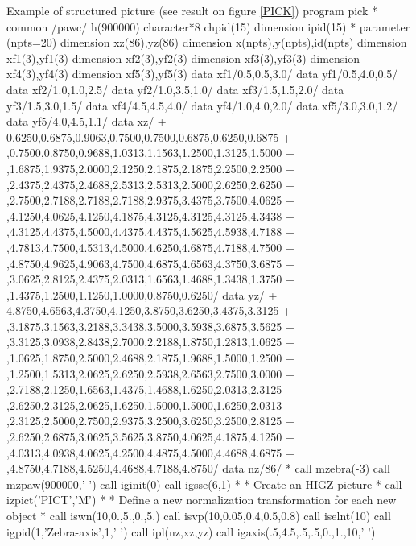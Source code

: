 \begin{XMPt}{Example of structured picture (see result on figure \ref{PICK})}
      program pick
*
      common /pawc/ h(900000)
      character*8 chpid(15)
      dimension ipid(15)
*
      parameter (npts=20)
      dimension xz(86),yz(86)
      dimension x(npts),y(npts),id(npts)
      dimension xf1(3),yf1(3)
      dimension xf2(3),yf2(3)
      dimension xf3(3),yf3(3)
      dimension xf4(3),yf4(3)
      dimension xf5(3),yf5(3)
      data xf1/0.5,0.5,3.0/
      data yf1/0.5,4.0,0.5/
      data xf2/1.0,1.0,2.5/
      data yf2/1.0,3.5,1.0/
      data xf3/1.5,1.5,2.0/
      data yf3/1.5,3.0,1.5/
      data xf4/4.5,4.5,4.0/
      data yf4/1.0,4.0,2.0/
      data xf5/3.0,3.0,1.2/
      data yf5/4.0,4.5,1.1/
      data xz/
     +   0.6250,0.6875,0.9063,0.7500,0.7500,0.6875,0.6250,0.6875
     +  ,0.7500,0.8750,0.9688,1.0313,1.1563,1.2500,1.3125,1.5000
     +  ,1.6875,1.9375,2.0000,2.1250,2.1875,2.1875,2.2500,2.2500
     +  ,2.4375,2.4375,2.4688,2.5313,2.5313,2.5000,2.6250,2.6250
     +  ,2.7500,2.7188,2.7188,2.7188,2.9375,3.4375,3.7500,4.0625
     +  ,4.1250,4.0625,4.1250,4.1875,4.3125,4.3125,4.3125,4.3438
     +  ,4.3125,4.4375,4.5000,4.4375,4.4375,4.5625,4.5938,4.7188
     +  ,4.7813,4.7500,4.5313,4.5000,4.6250,4.6875,4.7188,4.7500
     +  ,4.8750,4.9625,4.9063,4.7500,4.6875,4.6563,4.3750,3.6875
     +  ,3.0625,2.8125,2.4375,2.0313,1.6563,1.4688,1.3438,1.3750
     +  ,1.4375,1.2500,1.1250,1.0000,0.8750,0.6250/
      data yz/
     +   4.8750,4.6563,4.3750,4.1250,3.8750,3.6250,3.4375,3.3125
     +  ,3.1875,3.1563,3.2188,3.3438,3.5000,3.5938,3.6875,3.5625
     +  ,3.3125,3.0938,2.8438,2.7000,2.2188,1.8750,1.2813,1.0625
     +  ,1.0625,1.8750,2.5000,2.4688,2.1875,1.9688,1.5000,1.2500
     +  ,1.2500,1.5313,2.0625,2.6250,2.5938,2.6563,2.7500,3.0000
     +  ,2.7188,2.1250,1.6563,1.4375,1.4688,1.6250,2.0313,2.3125
     +  ,2.6250,2.3125,2.0625,1.6250,1.5000,1.5000,1.6250,2.0313
     +  ,2.3125,2.5000,2.7500,2.9375,3.2500,3.6250,3.2500,2.8125
     +  ,2.6250,2.6875,3.0625,3.5625,3.8750,4.0625,4.1875,4.1250
     +  ,4.0313,4.0938,4.0625,4.2500,4.4875,4.5000,4.4688,4.6875
     +  ,4.8750,4.7188,4.5250,4.4688,4.7188,4.8750/
      data nz/86/
*
      call mzebra(-3)
      call mzpaw(900000,' ')
      call iginit(0)
      call igsse(6,1)
*
*          Create an HIGZ picture
*
      call izpict('PICT','M')
*
*          Define a new normalization transformation for each new object
*
      call iswn(10,0.,5.,0.,5.)
      call isvp(10,0.05,0.4,0.5,0.8)
      call iselnt(10)
      call igpid(1,'Zebra-axis',1,' ')
      call ipl(nz,xz,yz)
      call igaxis(.5,4.5,.5,.5,0.,1.,10,' ')

\end{XMPt}
